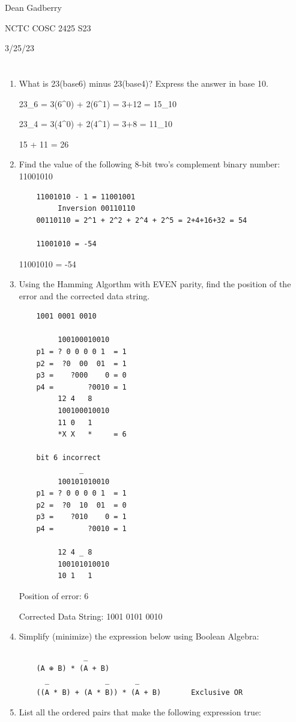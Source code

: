\documentclass[12pt,a4paper,english]{article}
\newcommand\answer[1]{\color{blue}#1\color{black}}
\begin{document}
Dean Gadberry

NCTC COSC 2425 S23

3/25/23
\section*{}
\begin{enumerate}
\item What is 23(base6) minus 23(base4)? Express the answer in base 10.
 
23_6 = 3(6^0) + 2(6^1) = 3+12 = 15_{10}
    
23_4 = 3(4^0) + 2(4^1) = 3+8 = 11_{10}
 
15 + 11 = \answer{26}

\item  Find the value of the following 8-bit two's complement binary number:
    11001010
\begin{lstlisting}
    11001010 - 1 = 11001001
         Inversion 00110110
    00110110 = 2^1 + 2^2 + 2^4 + 2^5 = 2+4+16+32 = 54
 
    11001010 = -54
\end{lstlisting}

\answer{11001010 = -54}

\item  Using the Hamming Algorthm with EVEN parity, find the position of the error and the corrected data string.
    
\begin{lstlisting}
    1001 0001 0010
 
         100100010010
    p1 = ? 0 0 0 0 1  = 1
    p2 =  ?0  00  01  = 1
    p3 =    ?000    0 = 0
    p4 =        ?0010 = 1
         12 4   8
         100100010010
         11 0   1     
         *X X   *     = 6
 
    bit 6 incorrect
              _
         100101010010
    p1 = ? 0 0 0 0 1  = 1
    p2 =  ?0  10  01  = 0
    p3 =    ?010    0 = 1
    p4 =        ?0010 = 1
 
         12 4 _ 8
         100101010010
         10 1   1
      \end{lstlisting}
      \answer{ Position of error: 6}

    \answer{Corrected Data String: 1001 0101 0010}

\item Simplify (minimize) the expression below using Boolean Algebra:
      \begin{lstlisting}
               _
    (A ⊕ B) * (A + B)
      _             _      _
    ((A * B) + (A * B)) * (A + B)       Exclusive OR
  \end{lstlisting}
\item List all the ordered pairs that make the following expression true:
 

\end{enumerate}
\end{document}
